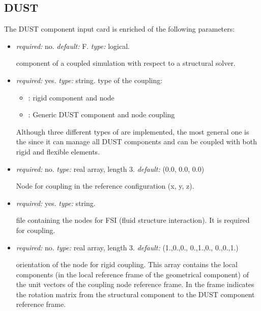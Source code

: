 \subsection{DUST}
\label{subsec:DUSTpreCICE}
The DUST component input card is enriched of the following parameters:
\begin{itemize}
    \item {} \textit{required:} no. \textit{default:} F. \textit{type:} logical.
    
    component of a coupled simulation with respect to a structural solver.
    
    \item {} \textit{required:} yes. \textit{type:} string. 
    type of the coupling:
    \begin{itemize}
        \item {}: rigid component and node 
        \item {}: Generic DUST component and node coupling
    \end{itemize}
    Although three different types of are implemented, the most general one is the  since it can manage all DUST components and can be coupled with both rigid and flexible elements.  
   
   \item {} \textit{required:} no. \textit{type:} real array, length 3. \textit{default:} (0.0, 0.0, 0.0)
   
   Node for  coupling in the reference configuration (x, y, z).
   
   \item {} \textit{required:} yes. \textit{type:} string. 
   
   file containing the nodes for FSI (fluid structure interaction). It is required for  coupling. 
   
   \item {} \textit{required:} no. \textit{type:} real array, length 3. \textit{default:} (1.,0.,0., 0.,1.,0., 0.,0.,1.)
   
   orientation of the node for rigid coupling. This array contains the local components (in the local reference frame of the geometrical           component) of the unit vectors of the coupling node reference frame. In the  frame indicates the rotation matrix from the structural component to the DUST component reference frame. 
   
\end{itemize}
